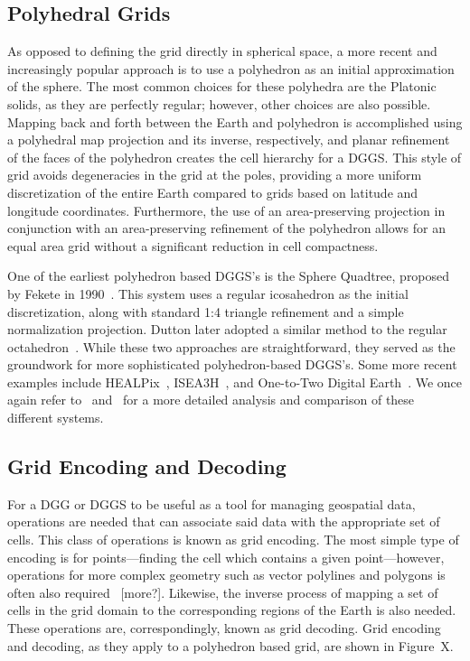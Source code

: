 \subsection{Polyhedral Grids}
As opposed to defining the grid directly in spherical space, a more recent and increasingly popular approach is to use a polyhedron as an initial approximation of the sphere.
The most common choices for these polyhedra are the Platonic solids, as they are perfectly regular; however, other choices are also possible.
Mapping back and forth between the Earth and polyhedron is accomplished using a polyhedral map projection and its inverse, respectively, and planar refinement of the faces of the polyhedron creates the cell hierarchy for a DGGS.
This style of grid avoids degeneracies in the grid at the poles, providing a more uniform discretization of the entire Earth compared to grids based on latitude and longitude coordinates.
Furthermore, the use of an area-preserving projection in conjunction with an area-preserving refinement of the polyhedron allows for an equal area grid without a significant reduction in cell compactness.


One of the earliest polyhedron based DGGS's is the Sphere Quadtree, proposed by Fekete in 1990~\cite{fekete1990sphere}.
This system uses a regular icosahedron as the initial discretization, along with standard 1:4 triangle refinement and a simple normalization projection.
Dutton later adopted a similar method to the regular octahedron~\cite{dutton1996encoding}.
While these two approaches are straightforward, they served as the groundwork for more sophisticated polyhedron-based DGGS's.
Some more recent examples include HEALPix~\cite{gorski2005healpix}, ISEA3H~\cite{sahr2003geodesic}, and One-to-Two Digital Earth~\cite{mahdavi2013one}.
We once again refer to~\cite{mahdavi2015survey} and~\cite{alderson2020digital} for a more detailed analysis and comparison of these different systems.


\subsection{Grid Encoding and Decoding}
For a DGG or DGGS to be useful as a tool for managing geospatial data, operations are needed that can associate said data with the appropriate set of cells.
This class of operations is known as grid encoding.
The most simple type of encoding is for points---finding the cell which contains a given point---however, operations for more complex geometry such as vector polylines and polygons is often also required~\cite{du2018duality} [more?].
Likewise, the inverse process of mapping a set of cells in the grid domain to the corresponding regions of the Earth is also needed.
These operations are, correspondingly, known as grid decoding.
Grid encoding and decoding, as they apply to a polyhedron based grid, are shown in Figure~X.


